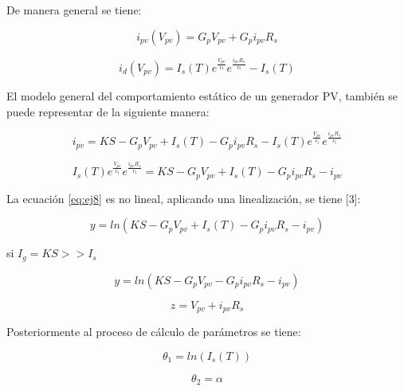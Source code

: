 De manera general se tiene: 

\begin{equation} \label{eq:ej5}
  i_{pv} \left(V_{pv}\right) 
  =
  G_{p}V_{pv} + G_{p}i_{pv}R_s
\end{equation}


\begin{equation} \label{eq:ej6}
  i_{d} \left(V_{pv}\right) 
  =
  I_s \left(T \right) e^\frac{V_{pv}}{v_t} e^\frac{ i_{pv}R_{s}}{v_t} -I_s \left(T \right)
\end{equation}

El modelo general del comportamiento estático de un generador PV, también se puede representar de la siguiente manera: 

\begin{equation} \label{eq:ej7}
  i_{pv}  
  =
  KS - G_{p}V_{pv} + I_s \left(T \right) - G_{p}i_{pv}R_s - I_s \left(T \right) e^\frac{V_{pv}}{v_t} e^\frac{ i_{pv}R_{s}}{v_t} 
\end{equation}

\begin{equation} \label{eq:ej8}
  I_s \left(T \right) e^\frac{V_{pv}}{v_t} e^\frac{ i_{pv}R_{s}}{v_t}   
  =
  KS - G_{p}V_{pv} + I_s \left(T \right) - G_{p}i_{pv}R_s - i_{pv} 
\end{equation}

La ecuación \ref{eq:ej8} es no lineal, aplicando una linealización, se tiene [3]: 

\begin{equation} \label{eq:ej9}
  y = ln \left(KS - G_{p}V_{pv} + I_s \left(T \right) - G_{p}i_{pv}R_s - i_{pv} \right) 
\end{equation}

si $ I_g = KS >> I_s $

\begin{equation} \label{eq:ej10}
  y = ln \left(KS - G_{p}V_{pv} - G_{p}i_{pv}R_s - i_{pv} \right) 
\end{equation}

\begin{equation} \label{eq:ej11}
  z = V_{pv} + i_{pv}R_s  
\end{equation}

Posteriormente al proceso de cálculo de parámetros se tiene: 

\begin{equation} \label{eq:ej12}
  \theta_1  = ln\left( I_s \left(T \right) \right)
\end{equation}

\begin{equation} \label{eq:ej13}
  \theta_2  = \alpha 
\end{equation}

